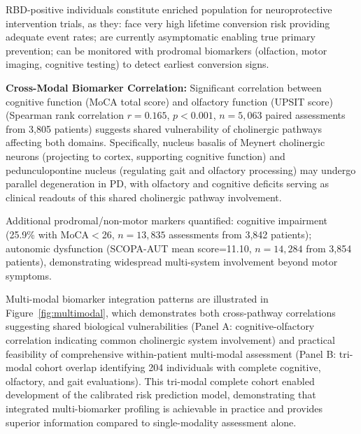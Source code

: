 \documentclass[11pt]{article}
\begin{document}
RBD-positive individuals constitute enriched population for neuroprotective intervention trials, as they: face very high lifetime conversion risk providing adequate event rates; are currently asymptomatic enabling true primary prevention; can be monitored with prodromal biomarkers (olfaction, motor imaging, cognitive testing) to detect earliest conversion signs.

\textbf{Cross-Modal Biomarker Correlation:} Significant correlation between cognitive function (MoCA total score) and olfactory function (UPSIT score) (Spearman rank correlation $r=0.165$, $p<0.001$, $n=5,063$ paired assessments from 3,805 patients) suggests shared vulnerability of cholinergic pathways affecting both domains. Specifically, nucleus basalis of Meynert cholinergic neurons (projecting to cortex, supporting cognitive function) and pedunculopontine nucleus (regulating gait and olfactory processing) may undergo parallel degeneration in PD\cite{bohnen2013cholinergic,perez2016cholinergic}, with olfactory and cognitive deficits serving as clinical readouts of this shared cholinergic pathway involvement.

Additional prodromal/non-motor markers quantified: cognitive impairment (25.9\% with MoCA$<$26, $n=13,835$ assessments from 3,842 patients); autonomic dysfunction (SCOPA-AUT mean score=11.10, $n=14,284$ from 3,854 patients), demonstrating widespread multi-system involvement beyond motor symptoms.

Multi-modal biomarker integration patterns are illustrated in Figure~\ref{fig:multimodal}, which demonstrates both cross-pathway correlations suggesting shared biological vulnerabilities (Panel A: cognitive-olfactory correlation indicating common cholinergic system involvement) and practical feasibility of comprehensive within-patient multi-modal assessment (Panel B: tri-modal cohort overlap identifying 204 individuals with complete cognitive, olfactory, and gait evaluations). This tri-modal complete cohort enabled development of the calibrated risk prediction model, demonstrating that integrated multi-biomarker profiling is achievable in practice and provides superior information compared to single-modality assessment alone.
\end{document}

